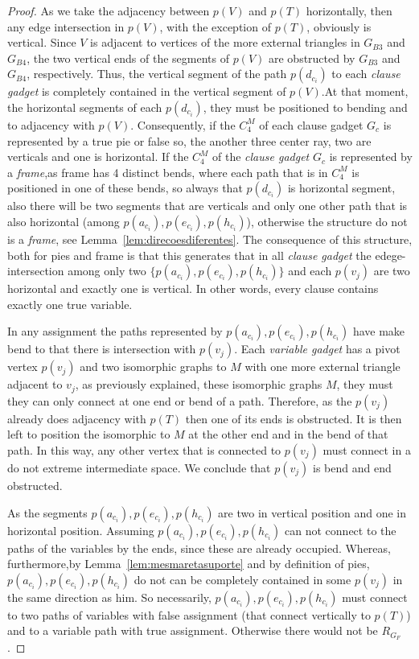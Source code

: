 \documentclass[a4paper,11pt]{article}
\begin{document}
\begin{proof}
As we take the adjacency between $p(V)$ and $p(T)$ horizontally, then any edge intersection in $p(V)$, with the exception of $p(T)$, obviously is vertical. Since $V$ is adjacent to vertices of the more external triangles in $G_{B3}$ and $G_{B4}$, the two vertical ends of the segments of $p(V)$ are obstructed by $G_{B3}$ and $G_{B4}$, respectively. Thus, the vertical segment of the path $p(d_{c_i})$ to each \textit{clause gadget} is completely contained in the vertical segment of $p(V)$.At that moment, the horizontal segments of each $p(d_{c_i})$, they must be positioned  to bending and to adjacency with $p(V)$. Consequently, if the $C_4^M$ of each clause gadget $G_c$ is  represented by a true pie or false so, the another three center ray, two are verticals and one is horizontal. If the $C_4^M$ of the \textit{clause gadget} $G_c$ is represented by a  \textit{frame},as frame has 4 distinct bends, where each path that is in $C_4^M$ is positioned in one of these bends, so always that $p(d_{c_i})$ is horizontal segment, also there will be two segments that are verticals and only one other path that is also horizontal (among $p(a_{c_i}),p(e_{c_i}), p(h_{c_i})$), otherwise the structure do not is a  \textit{frame}, see Lemma~\ref{lem:direcoesdiferentes}. The consequence of this structure, both for pies and frame is that this generates that in all \textit{clause gadget} the edege-intersection among only two $\{p(a_{c_i}), p(e_{c_i}), p(h_{c_i})\}$ and each $p(v_{j})$ are two horizontal and exactly one is vertical. In other words, every clause contains exactly one true variable.

In any assignment the paths represented by $p(a_{c_i}), p(e_{c_i}), p(h_{c_i})$ have make bend to that there is intersection with $p(v_{j})$. Each \textit{variable gadget} has a pivot vertex  $p(v_{j})$ and two isomorphic graphs to $M$ with one more external triangle adjacent to $v_j$, as previously explained, these isomorphic graphs $M$, they must they can only connect at one end or bend of a path. Therefore, as the $p(v_{j})$ already does  adjacency with $p(T)$ then one of its ends is obstructed. It is then left to position the isomorphic to $M$ at the other end and in the bend of that path. In this way, any other vertex that is connected to   $p(v_{j})$ must connect in a do not extreme intermediate space. We conclude that $p(v_{j})$ is bend and end obstructed. 

As the segments $p(a_{c_i}), p(e_{c_i}), p(h_{c_i})$ are two in vertical position and one  in horizontal position. Assuming $p(a_{c_i}), p(e_{c_i}), p(h_{c_i})$ can not connect to the paths of the variables by the ends, since these are already occupied. Whereas, furthermore,by Lemma~\ref{lem:mesmaretasuporte} and by definition of pies, $p(a_{c_i}), p(e_{c_i}), p(h_{c_i})$ do not can be completely contained in some $p(v_j)$ in the same direction as him. So necessarily, $p(a_{c_i}), p(e_{c_i}), p(h_{c_i})$ must connect to two paths of variables with false assignment (that connect vertically to
 $p(T)$) and to a variable path with true assignment. Otherwise there would not be $R_{G_F}$.



\end{proof}
\end{document}
